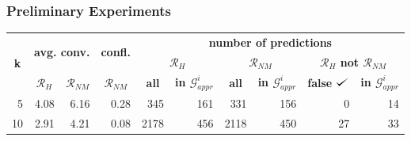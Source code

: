 \documentclass{beamer}
\newcommand{\hilightgray}[1]{\colorbox{gray!38}{#1}}
\newcommand{\hilightgreen}[1]{\colorbox{darkgreen!38}{#1}}
\def\checkmark{\tikz\fill[scale=0.4](0,.35) -- (.25,0) -- (1,.7) -- (.25,.15) -- cycle;}
\newcommand{\hilightbl}[1]{\colorbox{darkblue!18}{#1}}
\def\cG{\ensuremath{\mathcal{G}}}
\def\cR{\ensuremath{\mathcal{R}}}
\newcommand{\mi}[1]{\ensuremath{\mathit{#1}}}
\begin{document}
\begin{frame}\frametitle{Preliminary Experiments}
\centering
\begin{table}[]
\scriptsize
\begin{tabular}{|r|r|r|r|r|r|r|r|r|r|}
\hline
\multicolumn{1}{|c|}{\multirow{3}{*}{\textbf{k}}} & \multicolumn{2}{c|}{\multirow{2}{*}{\textbf{avg. conv.}}}            & \multicolumn{1}{c|}{\multirow{2}{*}{\textbf{confl.}}} & \multicolumn{6}{c|}{\textbf{number of predictions}}                                                                                                                                                                                                           \\ \cline{5-10} 
\multicolumn{1}{|c|}{}                            & \multicolumn{2}{c|}{}                                                & \multicolumn{1}{c|}{}                                 & \multicolumn{2}{c|}{\textbf{$\cR_{\mi{H}}$}}                                           & \multicolumn{2}{c|}{\textbf{$\cR_{\mi{NM}}$}}                                          & \multicolumn{2}{c|}{\textbf{$\cR_{\mi{H}}$ not $\cR_{\mi{NM}}$}}                                                        \\ \cline{2-10} 
\multicolumn{1}{|c|}{}                            & \multicolumn{1}{c|}{\textbf{$\cR_{\mi{H}}$}} & \multicolumn{1}{c|}{\textbf{$\cR_{\mi{NM}}$}} & \multicolumn{1}{c|}{\textbf{$\cR_{\mi{NM}}$}}                     & \multicolumn{1}{c|}{\textbf{all}} & \multicolumn{1}{c|}{\textbf{in $\cG_{\mi{appr}}^i$}} & \multicolumn{1}{c|}{\textbf{all}} & \multicolumn{1}{c|}{\textbf{in $\cG_{\mi{appr}}^i$}} & \multicolumn{1}{c|}{\textbf{false} $\checkmark$} & \multicolumn{1}{c|}{\textbf{in $\cG_{\mi{appr}}^i$}} \\ \hline
5                                                 & 4.08                             & 6.16                              & 0.28                                                  & 345                               & 161                                    & 331                               & \hilightbl{156}                                    & \hilightgray{0}                                                  & \hilightgreen{14}                                             \\
10                                                & 2.91                             & 4.21                              & 0.08                                                  & 2178                              & 456                                    & 2118                              & \hilightbl{450}                                    & \hilightgray{27}                                                 & \hilightgreen{33}                                             \\

\end{tabular}
\end{table}
\end{frame}
\end{document}
